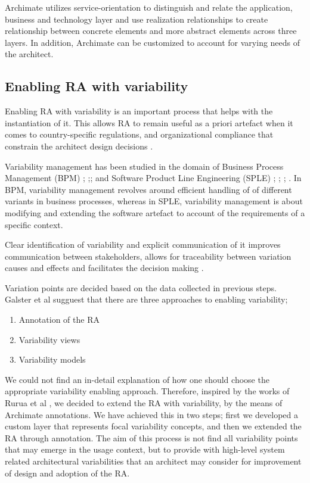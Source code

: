 \documentclass[review]{elsarticle}
\begin{document}
Archimate utilizes service-orientation to distinguish and relate the application, business and technology layer and use realization relationships to create relationship between concrete elements and more abstract elements across three layers. In addition, Archimate can be customized to account for varying needs of the architect.

\subsection{Enabling RA with variability}

Enabling RA with variability is an important process that helps with the instantiation of it. 
This allows RA to remain useful as a priori artefact when it comes to country-specific regulations, and organizational compliance that constrain the architect design decisions \cite{rurua2019representing}.

Variability management has been studied in the domain of Business Process Management (BPM) \cite{la2009questionnaire}; ;\cite{rosemann2007configurable}; \cite{hallerbach2010capturing} and Software Product Line Engineering (SPLE) \cite{pohl2005software}\cite{chen2011systematic}; \cite{schmid2004customizable}; \cite{svahnberg2005taxonomy}; \cite{sinnema2006covamof}. In BPM, variability management revolves around efficient handling of of different variants in business processes, whereas in SPLE, variability management is about modifying and extending the software artefact to account of the requirements of a specific context.

Clear identification of variability and explicit communication of it improves communication between stakeholders, allows for traceability between variation causes and effects and facilitates the decision making \cite{czarnecki2012cool}. 

Variation points are decided based on the data collected in previous steps. Galster et al \cite{galster2011empirically} sugguest that there are three approaches to enabling variability;

\begin{enumerate}
    \item Annotation of the RA
    \item Variability views 
    \item Variability models
\end{enumerate}

We could not find an in-detail explanation of how one should choose the appropriate variability enabling approach. Therefore, inspired by the works of Rurua et al \cite{rurua2019representing}, we decided to extend the RA with variability, by the means of Archimate annotations. We have achieved this in two steps; first we developed a custom layer that represents focal variability concepts, and then we extended the RA through annotation. The aim of this process is not find all variability points that may emerge in the usage context, but to provide with high-level system related architectural variabilities that an architect may consider for improvement of design and adoption of the RA.
\end{document}
